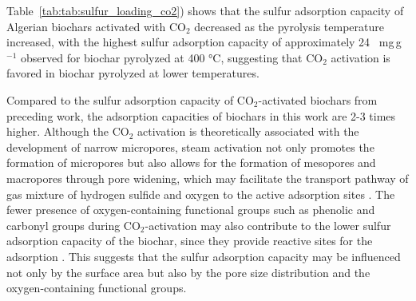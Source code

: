 
Table~\ref{tab:tab:sulfur_loading_co2}) shows that the sulfur adsorption capacity of Algerian biochars activated with CO$_2$ decreased as the pyrolysis temperature increased, with the highest sulfur adsorption capacity of approximately 24 ~mg\,g$^{-1}$ observed for biochar pyrolyzed at 400 °C, suggesting that CO$_2$ activation is favored in biochar pyrolyzed at lower temperatures. 

\vspace{0.3em}

Compared to the sulfur adsorption capacity of CO$_2$-activated biochars from preceding work, the adsorption capacities of biochars in this work are 2-3 times higher. Although the CO$_2$ activation is theoretically associated with the development of narrow micropores, steam activation not only promotes the formation of micropores but also allows for the formation of mesopores and macropores through pore widening, which may facilitate the transport pathway of gas mixture of hydrogen sulfide and oxygen to the active adsorption sites \cite{Sajjadi2019}. The fewer presence of oxygen-containing functional groups such as phenolic and carbonyl groups during CO$_2$-activation may also contribute to the lower sulfur adsorption capacity of the biochar, since they provide reactive sites for the adsorption \cite{Sajjadi2019}. This suggests that the sulfur adsorption capacity may be influenced not only by the surface area but also by the pore size distribution and the oxygen-containing functional groups.

